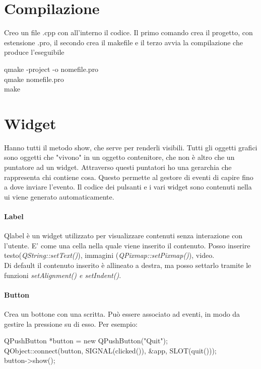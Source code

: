 \section{Compilazione}
Creo un file .cpp con all'interno il codice. Il primo comando crea il progetto, con estensione .pro, il secondo crea il makefile e il terzo avvia la compilazione che produce l'eseguibile

\begin{tcolorbox}
qmake -project -o nomefile.pro\\
qmake nomefile.pro\\
make
\end{tcolorbox}

\section{Widget}
Hanno tutti il metodo show, che serve per renderli visibili. Tutti gli oggetti grafici sono oggetti che "vivono" in un oggetto contenitore, che non è altro che un puntatore ad un widget. Attraverso questi puntatori ho una gerarchia che rappresenta chi contiene cosa. Questo permette al gestore di eventi di capire fino a dove inviare l'evento. Il codice dei pulsanti e i vari widget sono contenuti nella ui viene generato automaticamente.

\paragraph{Label}
Qlabel è un widget utilizzato per visualizzare contenuti senza interazione con l'utente. E' come una cella nella quale viene inserito il contenuto. Posso inserire testo(\textit{QString::setText()}), immagini (\textit{QPixmap::setPixmap()}), video.\\
Di default il contenuto inserito è allineato a destra, ma posso settarlo tramite le funzioni \textit{setAlignment() e setIndent()}.\\

\paragraph{Button}
Crea un bottone con una scritta. Può essere associato ad eventi, in modo da gestire la pressione su di esso. Per esempio:\\

\begin{tcolorbox}
QPushButton *button = new QPushButton("Quit");\\
QObject::connect(button, SIGNAL(clicked()), \&app, SLOT(quit()));\\
button->show();
\end{tcolorbox}

